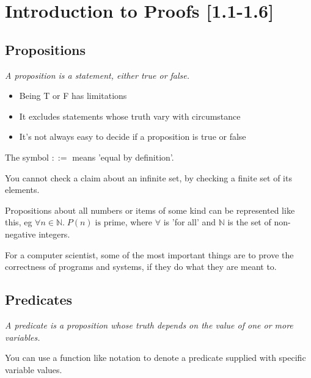 \section{Introduction to Proofs [1.1-1.6]}

\subsection{Propositions}

\emph{A proposition is a statement, either true or false.}

\begin{itemize}
    \item Being T or F has limitations
    \item It excludes statements whose truth vary with circumstance
    \item It's not always easy to decide if a proposition is true or false
\end{itemize}

\vspace{1mm}

The symbol \(::=\) means 'equal by definition'.

\vspace{1mm}

You cannot check a claim about an infinite set, by checking a finite set of its elements.

\vspace{1mm}

Propositions about all numbers or items of some kind can be represented like this, eg \(\forall n \in \mathbb{N}. \; P(n) \; \text{is prime}\), where \(\forall\) is 'for all' and \(\mathbb{N}\) is the set of non-negative integers. 

\vspace{1mm}

For a computer scientist, some of the most important things are to prove the correctness of programs and systems, if they do what they are meant to.

\subsection{Predicates}

\emph{A predicate is a proposition whose truth depends on the value of one or more variables.}

\vspace{1mm}

You can use a function like notation to denote a predicate supplied with specific variable values.

